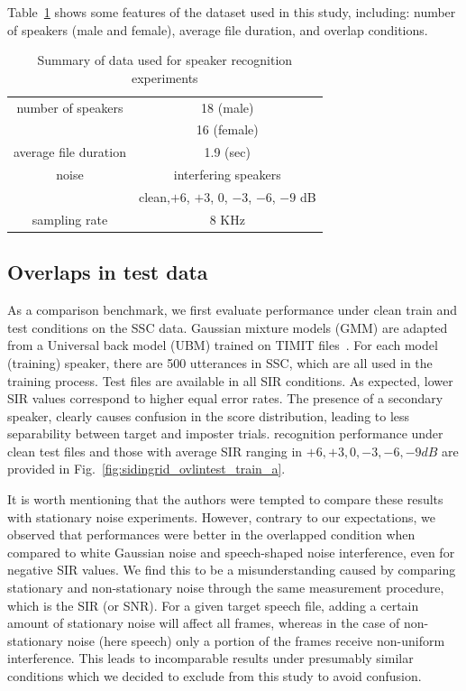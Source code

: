 Table~\ref{tab:data_summary} shows some features of the dataset used in this study, including: number of speakers (male and female), average file duration, and overlap conditions. 

\begin{table}[h!]
	\begin{center}
		\begin{tabular}{| c | c |}
			\hline
			\hline
			number of speakers	& 18 (male)  \\
			\hspace{4mm}			&  16 (female) \\
			\hline
			average file duration	&   1.9 (sec) \\ 
			\hline
			noise				& interfering speakers \\
			\hspace{4mm}			& clean,$+6$, $+3$, $0$, $-3$, $-6$, $-9$ dB \\
			\hline
			sampling rate			& $8$ KHz \\
			\hline
			\hline	
		\end{tabular}
		\caption{Summary of data used for speaker recognition experiments}
		\label{tab:data_summary}
	\end{center}
\end{table}


\subsection{Overlaps in test data}
\label{ssec:ch2_OvlinTest}
As a comparison benchmark, we first evaluate performance under clean train and test conditions on the SSC data. 
Gaussian mixture models (GMM) are adapted from a Universal back model (UBM) trained on TIMIT files~\cite{msridentity}. 
For each model (training) speaker, there are 500 utterances in SSC, which are all used in the training process. Test files are available in all SIR conditions. 
As expected, lower SIR values correspond to higher equal error rates. 
The presence of a secondary speaker, clearly causes confusion in the score distribution, leading to less separability between target and imposter trials. 
recognition performance under clean test files and those with average SIR ranging in $+6, +3, 0, -3, -6, -9 dB$ are provided in Fig.~\ref{fig:sidingrid_ovlintest_train_a}. 

It is worth mentioning that the authors were tempted to compare these results with stationary noise experiments. 
However, contrary to our expectations, we observed that performances were better in the overlapped condition when compared to white Gaussian noise and speech-shaped noise interference, even for negative SIR values. 
We find this to be a misunderstanding caused by comparing stationary and non-stationary noise through the same measurement procedure, which is the SIR (or SNR). 
For a given target speech file, adding a certain amount of stationary noise will affect all frames, whereas in the case of non-stationary noise (here speech) only a portion of the frames receive non-uniform interference. 
This leads to incomparable results under presumably similar conditions which we decided to exclude from this study to avoid confusion. 


